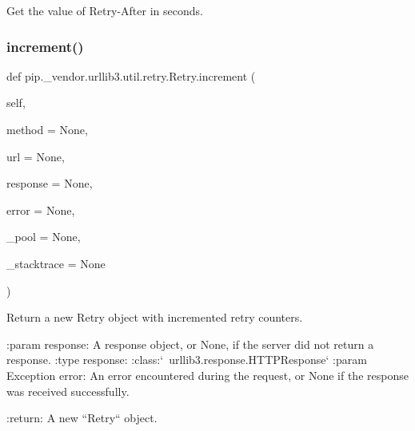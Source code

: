 \begin{DoxyVerb}Get the value of Retry-After in seconds.\end{DoxyVerb}
 \mbox{\label{classpip_1_1__vendor_1_1urllib3_1_1util_1_1retry_1_1Retry_a9ea1500ac63c8193d039755f462a1429}} 
\subsubsection{\texorpdfstring{increment()}{increment()}}
{\footnotesize\ttfamily def pip.\+\_\+vendor.\+urllib3.\+util.\+retry.\+Retry.\+increment (\begin{DoxyParamCaption}\item[{}]{self,  }\item[{}]{method = {\ttfamily None},  }\item[{}]{url = {\ttfamily None},  }\item[{}]{response = {\ttfamily None},  }\item[{}]{error = {\ttfamily None},  }\item[{}]{\+\_\+pool = {\ttfamily None},  }\item[{}]{\+\_\+stacktrace = {\ttfamily None} }\end{DoxyParamCaption})}

\begin{DoxyVerb}Return a new Retry object with incremented retry counters.

:param response: A response object, or None, if the server did not
    return a response.
:type response: :class:`~urllib3.response.HTTPResponse`
:param Exception error: An error encountered during the request, or
    None if the response was received successfully.

:return: A new ``Retry`` object.
\end{DoxyVerb}
 \mbox{\label{classpip_1_1__vendor_1_1urllib3_1_1util_1_1retry_1_1Retry_a8b97633f741ac38f97c6ab38131dbb5d}} 
